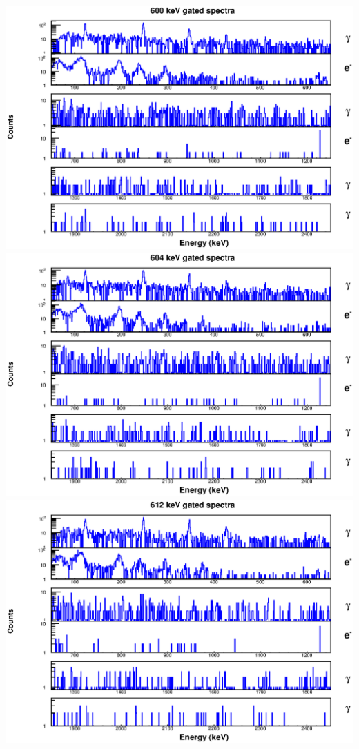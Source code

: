 \includegraphics[scale=0.8]{154Gd_Appendix/600_combined.eps}
\includegraphics[scale=0.8]{154Gd_Appendix/604_combined.eps}
\includegraphics[scale=0.8]{154Gd_Appendix/612_combined.eps}
